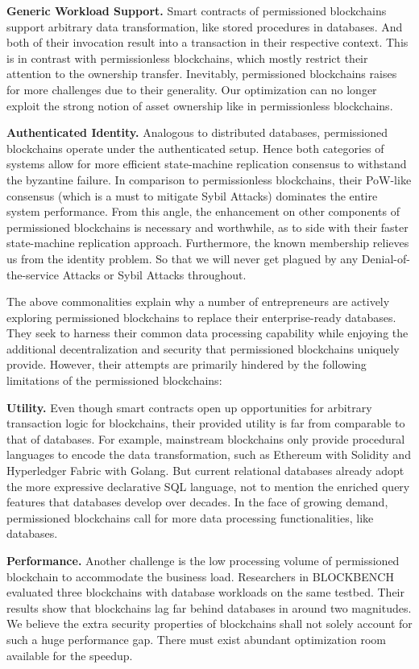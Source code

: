 \textbf{Generic Workload Support. } 
Smart contracts of permissioned blockchains support arbitrary data transformation, like stored procedures in databases. And both of their invocation result into a transaction in their respective context. 
This is in contrast with permissionless blockchains, which mostly restrict their attention to the ownership transfer. 
Inevitably, permissioned blockchains raises for more challenges due to their generality.
Our optimization can no longer exploit the strong notion of asset ownership like in permissionless blockchains. 

\textbf{Authenticated Identity. } 
Analogous to distributed databases, permissioned blockchains operate under the authenticated setup.
Hence both categories of systems allow for more efficient state-machine replication consensus to withstand the byzantine failure. 
In comparison to permissionless blockchains, their PoW-like consensus (which is a must to mitigate Sybil Attacks) dominates the entire system performance. 
From this angle, the enhancement on other components of permissioned blockchains is necessary and worthwhile, as to side with their faster state-machine replication approach. 
Furthermore, the known membership relieves us from the identity problem. 
So that we will never get plagued by any Denial-of-the-service Attacks or Sybil Attacks throughout. 

The above commonalities explain why a number of entrepreneurs are actively exploring permissioned blockchains to replace their enterprise-ready databases. 
They seek to harness their common data processing capability while enjoying the additional decentralization and security that permissioned blockchains uniquely provide. 
However, their attempts are primarily hindered by the following limitations of the permissioned blockchains:

\textbf{Utility. }
Even though smart contracts open up opportunities for arbitrary transaction logic for blockchains, their provided utility is far from comparable to that of databases. 
For example, mainstream blockchains only provide procedural languages to encode the data transformation, such as Ethereum with Solidity and Hyperledger Fabric with Golang. 
But current relational databases already adopt the more expressive declarative SQL language, not to mention the enriched query features that databases develop over decades. 
In the face of growing demand, permissioned blockchains call for more data processing functionalities, like databases. 

\textbf{Performance. }
Another challenge is the low processing volume of permissioned blockchain to accommodate the business load. 
Researchers in BLOCKBENCH evaluated three blockchains with database workloads on the same testbed. 
Their results show that blockchains lag far behind databases in around two magnitudes. 
We believe the extra security properties of blockchains shall not solely account for such a huge performance gap. 
There must exist abundant optimization room available for the speedup. 

